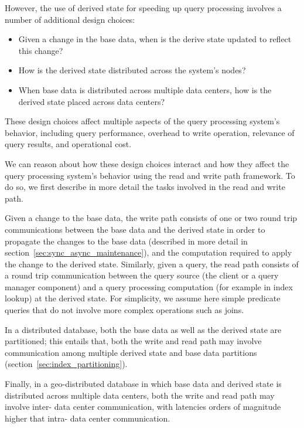 However, the use of derived state for speeding up query processing involves a number of additional design choices:
\begin{itemize}

  \item Given a change in the base data, when is the derive state updated to reflect this change?

  \item How is the derived state distributed across the system's nodes?

  \item When base data is distributed across multiple data centers, how is the derived state placed across data centers?

\end{itemize}

These design choices affect multiple aspects of the query processing system's behavior,
including query performance, overhead to write operation, relevance of query results, and operational cost.

We can reason about how these design choices interact and how they affect the query processing system's behavior
using the read and write path framework.
To do so, we first describe in more detail the tasks involved in the read and write path.

\medskip

Given a change to the base data,
the write path consists of one or two round trip communications between the base data and the derived state
in order to propagate the changes to the base data (described in more detail in section~\ref{sec:sync_async_maintenance}),
and the computation required to apply the change to the derived state.
Similarly, given a query, the read path consists of a round trip communication between the query source (the client or a
query manager component) and a query processing computation (for example in index lookup) at the derived state.
For simplicity, we assume here simple predicate queries that do not involve more complex operations such as joins.

In a distributed database, both the base data as well as the derived state are partitioned;
this entails that, both the write and read path may involve communication among multiple derived state and base data
partitions (section~\ref{sec:index_partitioning}).

Finally, in a geo-distributed database in which base data and derived state is distributed across multiple data centers,
both the write and read path may involve inter- data center communication, with latencies orders of magnitude
higher that intra- data center communication.


